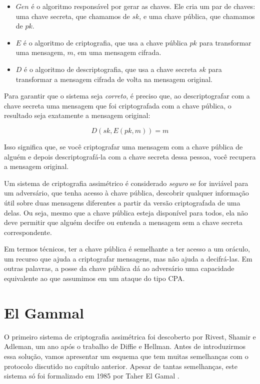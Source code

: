 \begin{itemize}
\item $Gen$ é o algoritmo responsável por gerar as chaves.
  Ele cria um par de chaves: uma chave secreta, que chamamos de $sk$, e uma chave pública, que chamamos de $pk$.
\item $E$ é o algoritmo de criptografia, que usa a chave pública $pk$ para transformar uma mensagem, $m$, em uma mensagem cifrada.
\item $D$ é o algoritmo de descriptografia, que usa a chave secreta $sk$ para transformar a mensagem cifrada de volta na mensagem original.
\end{itemize}

Para garantir que o sistema seja {\em correto}, é preciso que, ao descriptografar com a chave secreta uma mensagem que foi criptografada com a chave pública, o resultado seja exatamente a mensagem original:

\begin{displaymath}
  D(sk, E(pk, m)) = m
\end{displaymath}

Isso significa que, se você criptografar uma mensagem com a chave pública de alguém e depois descriptografá-la com a chave secreta dessa pessoa, você recupera a mensagem original.

Um sistema de criptografia assimétrico é considerado \textit{seguro} se for inviável para um adversário, que tenha acesso à chave pública, descobrir qualquer informação útil sobre duas mensagens diferentes a partir da versão criptografada de uma delas.
Ou seja, mesmo que a chave pública esteja disponível para todos, ela não deve permitir que alguém decifre ou entenda a mensagem sem a chave secreta correspondente.

Em termos técnicos, ter a chave pública é semelhante a ter acesso a um oráculo, um recurso que ajuda a criptografar mensagens, mas não ajuda a decifrá-las.
Em outras palavras, a posse da chave pública dá ao adversário uma capacidade equivalente ao que assumimos em um ataque do tipo CPA.



\section{El Gammal}
\label{sec:el-gammal}

O primeiro sistema de criptografia assimétrica foi descoberto por Rivest, Shamir e Adleman, um ano após o trabalho de Diffie e Hellman.
Antes de introduzirmos essa solução, vamos apresentar um esquema que tem muitas semelhanças com o protocolo discutido no capítulo anterior.
Apesar de tantas semelhanças, este sistema só foi formalizado em 1985 por Taher El Gamal \cite{ElGamal85}.

